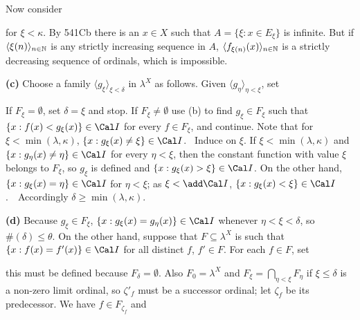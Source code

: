 {Now consider


\noindent for $\xi<\kappa$.   By 541Cb there is an $x\in X$ such that
$A=\{\xi:x\in E_{\xi}\}$ is infinite.   But if
$\langle\xi(n)\rangle_{n\in \Bbb N}$ is any strictly increasing sequence
in $A$, $\langle f_{\xi(n)}(x)\rangle_{n\in\Bbb N}$ is a strictly
decreasing sequence of ordinals, which is impossible.\ \Bang\Qed

\medskip

{\bf (c)} Choose a family
$\langle g_{\xi}\rangle_{\xi<\delta}$ in $\lambda^X$ as follows.   Given
$\langle g_{\eta}\rangle_{\eta<\xi}$, set


\noindent If $F_{\xi}=\emptyset$, set $\delta=\xi$ and stop.
If $F_{\xi}\ne\emptyset$ use (b) to find $g_{\xi}\in F_{\xi}$ such that
$\{x:f(x)<g_{\xi}(x)\}\in\Cal I$ for every $f\in F_{\xi}$,
and continue.   Note that for $\xi<\min(\lambda,\kappa)$,
$\{x:g_{\xi}(x)\ne \xi\}\in\Cal I$.   \Prf\ Induce on $\xi$.   If
$\xi<\min(\lambda,\kappa)$ and $\{x:g_{\eta}(x)\ne\eta\}\in\Cal I$ for
every $\eta<\xi$, then the constant function with value $\xi$ belongs to
$F_{\xi}$, so $g_{\xi}$ is defined and
$\{x:g_{\xi}(x)>\xi\}\in\Cal I$.   On the other hand,
$\{x:g_{\xi}(x)=\eta\}\in\Cal I$ for $\eta<\xi$;
as $\xi<\add\Cal I$, $\{x:g_{\xi}(x)<\xi\}\in\Cal I$.\ \QeD\  Accordingly
$\delta\ge\min(\lambda,\kappa)$.

\medskip

{\bf (d)} Because $g_{\xi}\in F_{\xi}$,
$\{x:g_{\xi}(x)=g_{\eta}(x)\}\in\Cal I$ whenever $\eta<\xi<\delta$, so
$\#(\delta)\le\theta$.   On the other hand, suppose that
$F\subseteq\lambda^X$ is such that $\{x:f(x)=f'(x)\}\in\Cal I$ for all
distinct $f$, $f'\in F$.   For each $f\in F$, set


\noindent this must be defined because $F_{\delta}=\emptyset$.
Also $F_0=\lambda^X$ and $F_{\xi}=\bigcap_{\eta<\xi}F_{\eta}$
if $\xi\le\delta$ is a non-zero limit ordinal, so $\zeta'_f$ must
be a successor ordinal;  let $\zeta_f$ be its predecessor.
We have $f\in F_{\zeta_f}$ and


}
